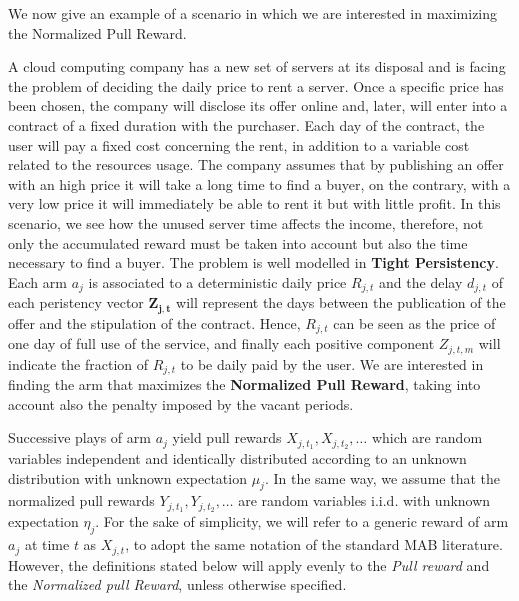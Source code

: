We now give an example of a scenario in which we are interested in maximizing the Normalized Pull Reward.
\begin{example}
\label{cloud}
A cloud computing company has a new set of servers at its disposal and is facing the problem of deciding the daily price to rent a server. Once a specific price has been chosen, the company will disclose its offer online and, later, will enter into a contract of a fixed duration with the purchaser. Each day of the contract, the user will pay a fixed cost concerning the rent, in addition to a variable cost related to the resources usage. The company assumes that by publishing an offer with an high price it will take a long time to find a buyer, on the contrary, with a very low price it will immediately be able to rent it but with little profit. In this scenario, we see how the unused server time affects the income, therefore, not only the accumulated reward must be taken into account but also the time necessary to find a buyer. The problem is well modelled in 	\textbf{Tight Persistency}. Each arm $a_j$ is associated to a deterministic daily price $R_{j,t}$ and the delay $d_{j,t}$ of each peristency vector $\boldsymbol{Z_{j,t}}$ will represent the days between the publication of the offer and the stipulation of the contract. Hence, $R_{j,t}$ can be seen as the price of one day of full use of the service, and finally each positive component $Z_{j,t,m}$ will indicate the fraction of $R_{j,t}$ to be daily paid by the user. We are interested in finding the arm that maximizes the \textbf{Normalized Pull Reward}, taking into account also the penalty imposed by the vacant periods.

\end{example}

Successive plays of arm $a_j$ yield pull rewards $X_{j,t_1}, X_{j,t_2},\dots$ which are random variables independent and identically distributed according to an unknown distribution with unknown expectation $\mu_j$.
In the same way, we assume that the normalized pull rewards $Y_{j,t_1}, Y_{j,t_2}, \dots$ are random variables i.i.d. with unknown expectation $\eta_j$. For the sake of simplicity, we will refer to a generic reward of arm $a_j$ at time $t$ as  $X_{j,t}$, to adopt the same notation of the standard MAB literature. However, the definitions stated below will apply evenly to the \emph{Pull reward} and the \emph{Normalized pull Reward}, unless otherwise specified.\\

